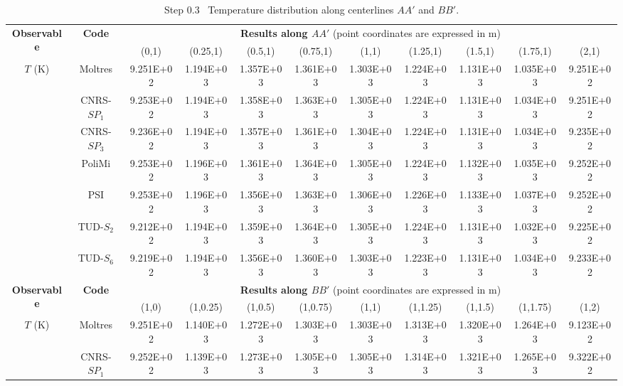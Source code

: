 \begin{table}[htbp!]
	\caption{Step 0.3 \textemdash\ Temperature distribution along centerlines $AA'$ and $BB'$.}
	\label{table:0.3}
	\centering
	\footnotesize
	\setlength\tabcolsep{1.5pt}
	\hspace*{-1cm}
	\renewcommand{\arraystretch}{.8}
	\begin{tabular}{c c c c c c c c c c c}
		\toprule
		\multirow{2}{*}{\textbf{Observable}} & \multirow{2}{*}{\textbf{Code}} & \multicolumn{9}{c}{\textbf{Results along $AA'$} (point coordinates are expressed in m)} \\
		& & {(0,1)} & {(0.25,1)} & {(0.5,1)} & {(0.75,1)} & {(1,1)} & {(1.25,1)} & {(1.5,1)} & {(1.75,1)} & {(2,1)} \\
		\midrule
		\multirow{7}{*}{$T$ (K)} & Moltres & 9.251E+02 & 1.194E+03 & 1.357E+03 & 1.361E+03 &
		1.303E+03 & 1.224E+03 & 1.131E+03 & 1.035E+03 & 9.251E+02 \\
		& CNRS-$SP_1$ & 9.253E+02 & 1.194E+03 & 1.358E+03 & 1.363E+03 & 1.305E+03 & 1.224E+03 & 1.131E+03 & 1.034E+03 & 9.251E+02 \\
		& CNRS-$SP_3$ & 9.236E+02 & 1.194E+03 & 1.357E+03 & 1.361E+03 & 1.304E+03 & 1.224E+03 & 1.131E+03 & 1.034E+03 & 9.235E+02 \\
		& PoliMi & 9.253E+02 & 1.196E+03 & 1.361E+03 & 1.364E+03 & 1.305E+03 & 1.224E+03 & 1.132E+03 & 1.035E+03 & 9.252E+02 \\
		& PSI & 9.253E+02 & 1.196E+03 & 1.356E+03 & 1.363E+03 & 1.306E+03 & 1.226E+03 & 1.133E+03 & 1.037E+03 & 9.252E+02 \\
		& TUD-$S_2$ & 9.212E+02 & 1.194E+03 & 1.359E+03 & 1.364E+03 & 1.305E+03 & 1.224E+03 & 1.131E+03 & 1.032E+03 & 9.225E+02 \\
		& TUD-$S_6$ & 9.219E+02 & 1.194E+03 & 1.356E+03 & 1.360E+03 & 1.303E+03 & 1.223E+03 & 1.131E+03 & 1.034E+03 & 9.233E+02 \\
		\midrule
		\midrule
		\multirow{2}{*}{\textbf{Observable}} & \multirow{2}{*}{\textbf{Code}} & \multicolumn{9}{c}{\textbf{Results along $BB'$} (point coordinates are expressed in m)} \\
		& & {(1,0)} & {(1,0.25)} & {(1,0.5)} & {(1,0.75)} & {(1,1)} & {(1,1.25)} & {(1,1.5)} & {(1,1.75)} & {(1,2)} \\
		\midrule
		\multirow{7}{*}{$T$ (K)} & Moltres & 9.251E+02 & 1.140E+03 & 1.272E+03 & 1.303E+03 &
		1.303E+03 & 1.313E+03 & 1.320E+03 & 1.264E+03 & 9.123E+02 \\
		& CNRS-$SP_1$ & 9.252E+02 & 1.139E+03 & 1.273E+03 & 1.305E+03 & 1.305E+03 & 1.314E+03 & 1.321E+03 & 1.265E+03 & 9.322E+02 \\

\end{tabular}
\end{table}
